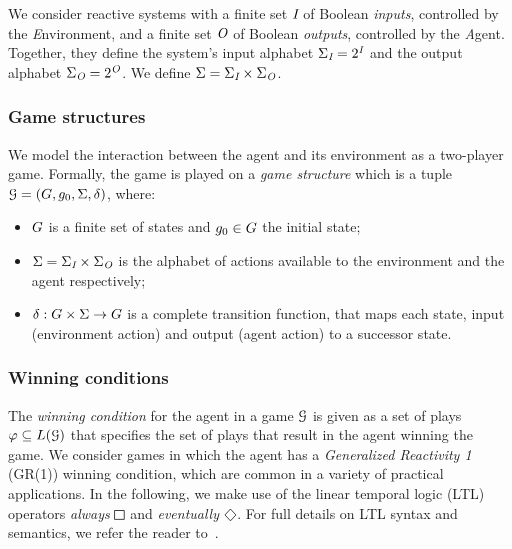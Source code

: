 
%
We consider reactive systems with a finite set $\textit{I}$ of Boolean \emph{inputs}, controlled by the \emph{E}nvironment, and a finite set $\textit{O}$ of Boolean \emph{ outputs}, controlled by the \emph{A}gent. Together, they define the system's input alphabet $\Sigma_{\textit{I}}=2^{\textit{I}}$ and the output alphabet $\Sigma_{\textit{O}}=2^{\textit{O}}$. We define $\Sigma=\Sigma_{\textit{I}} \times \Sigma_{\textit{O}}$. 

\subsubsection*{Game structures}
%
We model the interaction between the agent and its environment as a two-player game. Formally, the game is played on a \emph{game structure} which is a tuple 
$\mathcal{G} = (G, g_0, \Sigma, \delta)$,
where:
\begin{itemize}
\item $G$ is a finite set of states and $g_0 \in G$ the initial state;
\item $\Sigma = \Sigma_{\textit{I}} \times \Sigma_{\textit{O}}$ is the alphabet of actions available to the environment and the agent respectively;
\item $\delta: G \times \Sigma \rightarrow G$
is a complete transition function, that maps each state, input (environment action) and output (agent action) to a successor state.
\end{itemize}

  

\subsubsection*{Winning conditions}
%
The \emph{winning condition} for the agent in a game $\mathcal{G}$ is given as a set of plays $\varphi \subseteq L(\mathcal{G})$ that specifies the set of plays that result in the agent winning the game. We consider games in which the agent has a \emph{Generalized Reactivity 1} (GR(1)) winning condition, which are common in a variety of practical applications. In the following, we make use of the linear temporal logic (LTL) operators \emph{always} $\LTLglobally$ and \emph{eventually} $\LTLfinally$. For full details on LTL syntax and semantics, we refer the reader to~\cite{MCBook}.

